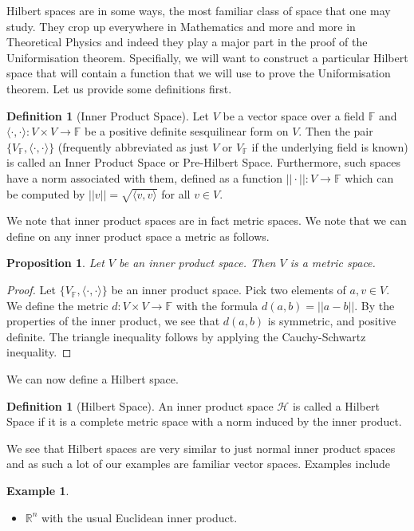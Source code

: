 \documentclass[a4paper,12pt]{report}
\theoremstyle{plain}
\newtheorem{prop}[thm]{Proposition}
\theoremstyle{definition}
\newtheorem{defn}[thm]{Definition}
\newtheorem{example}[thm]{Example}
\begin{document}
Hilbert spaces are in some ways, the most familiar class of space that one may study. They crop up everywhere in Mathematics and more and more in Theoretical Physics and indeed they play a major part in the proof of the Uniformisation theorem. Specifially, we will want to construct a particular Hilbert space that will contain a function that we will use to prove the Uniformisation theorem. Let us provide some definitions first.

\begin{defn}[Inner Product Space]
  Let $V$ be a vector space over a field $\mathbb{F}$ and $\langle \cdot,\cdot \rangle \colon V \times V \rightarrow \mathbb{F}$ be a positive definite sesquilinear form on $V$. Then the pair $\{V_{\mathbb{F}}, \langle \cdot,\cdot \rangle\}$ (frequently abbreviated as just $V$ or $V_{\mathbb{F}}$ if the underlying field is known) is called an Inner Product Space or Pre-Hilbert Space. Furthermore, such spaces have a norm associated with them, defined as a function $||\cdot|| \colon V \rightarrow \mathbb{F}$ which can be computed by $||v|| = \sqrt{\langle v,v \rangle}$ for all $v \in V$. 
\end{defn}

We note that inner product spaces are in fact metric spaces. We note that we can define on any inner product space a metric as follows.
\begin{prop}
  Let $V$ be an inner product space. Then $V$ is a metric space.
\end{prop}
\begin{proof}
  Let $\{V_{\mathbb{F}},\langle \cdot,\cdot \rangle\}$ be an inner product space. Pick two elements of $a,v \in V$. We define the metric $d:V\times V \rightarrow \mathbb{F}$ with the formula $d(a,b)=||a-b||$. By the properties of the inner product, we see that $d(a,b)$ is symmetric, and positive definite. The triangle inequality follows by applying the Cauchy-Schwartz inequality. 
\end{proof}
We can now define a Hilbert space.
\begin{defn}[Hilbert Space]
  An inner product space $\mathcal{H}$ is called a Hilbert Space if it is a complete metric space with a norm induced by the inner product.
\end{defn}

We see that Hilbert spaces are very similar to just normal inner product spaces and as such a lot of our examples are familiar vector spaces. Examples include
\begin{example}
  \begin{itemize}
    \item $\mathbb{R}^n$ with the usual Euclidean inner product.
  \end{itemize}
\end{example}
\end{document}
